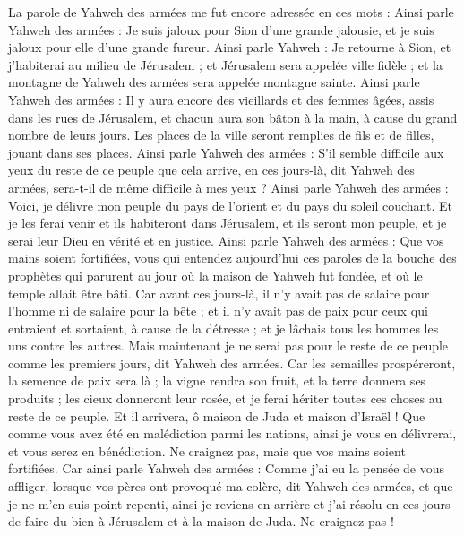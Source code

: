 \begin{multicols}{2}
\VerseOne{}La parole de Yahweh des armées me fut encore adressée en ces mots :
Ainsi parle Yahweh des armées : Je suis jaloux pour Sion d'une grande jalousie, et je suis jaloux pour elle d'une grande fureur.
Ainsi parle Yahweh : Je retourne à Sion, et j'habiterai au milieu de Jérusalem ; et Jérusalem sera appelée ville fidèle ; et la montagne de Yahweh des armées sera appelée montagne sainte.
Ainsi parle Yahweh des armées : Il y aura encore des vieillards et des femmes âgées, assis dans les rues de Jérusalem, et chacun aura son bâton à la main, à cause du grand nombre de leurs jours.
Les places de la ville seront remplies de fils et de filles, jouant dans ses places.
Ainsi parle Yahweh des armées : S'il semble difficile aux yeux du reste de ce peuple que cela arrive, en ces jours-là, dit Yahweh des armées, sera-t-il de même difficile à mes yeux ?
Ainsi parle Yahweh des armées : Voici, je délivre mon peuple du pays de l'orient et du pays du soleil couchant.
Et je les ferai venir et ils habiteront dans Jérusalem, et ils seront mon peuple, et je serai leur Dieu en vérité et en justice.
Ainsi parle Yahweh des armées : Que vos mains soient fortifiées, vous qui entendez aujourd'hui ces paroles de la bouche des prophètes qui parurent au jour où la maison de Yahweh fut fondée, et où le temple allait être bâti.
Car avant ces jours-là, il n'y avait pas de salaire pour l'homme ni de salaire pour la bête ; et il n'y avait pas de paix pour ceux qui entraient et sortaient, à cause de la détresse ; et je lâchais tous les hommes les uns contre les autres.
Mais maintenant je ne serai pas pour le reste de ce peuple comme les premiers jours, dit Yahweh des armées.
Car les semailles prospéreront, la semence de paix sera là ; la vigne rendra son fruit, et la terre donnera ses produits ; les cieux donneront leur rosée, et je ferai hériter toutes ces choses au reste de ce peuple.
Et il arrivera, ô maison de Juda et maison d'Israël ! Que comme vous avez été en malédiction parmi les nations, ainsi je vous en délivrerai, et vous serez en bénédiction. Ne craignez pas, mais que vos mains soient fortifiées.
Car ainsi parle Yahweh des armées : Comme j'ai eu la pensée de vous affliger, lorsque vos pères ont provoqué ma colère, dit Yahweh des armées, et que je ne m'en suis point repenti,
ainsi je reviens en arrière et j'ai résolu en ces jours de faire du bien à Jérusalem et à la maison de Juda. Ne craignez pas !

\end{multicols}
